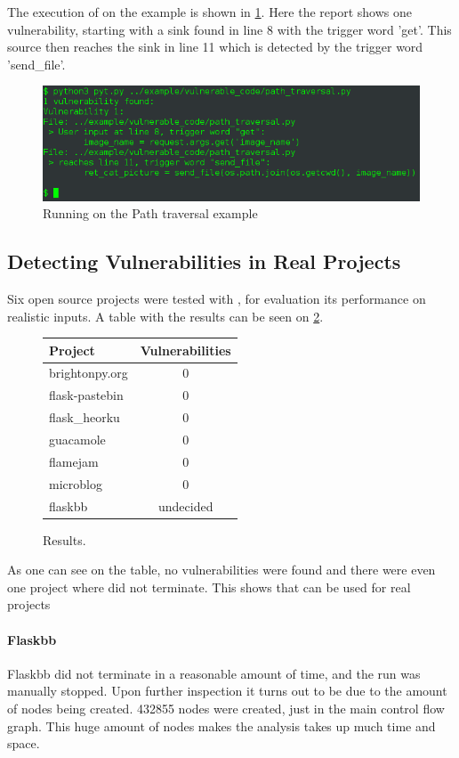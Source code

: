 The execution of \pyt{} on the example is shown in \cref{path_traversal:console}.
Here the report shows one vulnerability, starting with a sink found in line 8 with the trigger word 'get'.
This source then reaches the sink in line 11 which is detected by the trigger word 'send\_file'.

\begin{figure}
  \includegraphics[width=\textwidth]{./figures/path_traversal_console.png}
  \caption{Running \pyt{} on the Path traversal example}
  \label{path_traversal:console}
\end{figure}

\subsection{Detecting Vulnerabilities in Real Projects}\label{evaluation:real}
Six open source projects were tested with \pyt{}, for evaluation its performance on realistic inputs.
A table with the results can be seen on \cref{evaluation:real:table}.

\begin{figure}
  \centering
  \begin{tabular}{|l|c|}
    \hline
    \textbf{Project} & \textbf{Vulnerabilities} \\
    \hline
    \hline
    brightonpy.org\cite{brightonpy} & 0 \\
    flask-pastebin\cite{flask_pastebin} & 0 \\
    flask\_heorku\cite{flask_heroku} & 0 \\
    guacamole\cite{guacamole} & 0 \\
    flamejam\cite{flamejam} & 0 \\
    microblog\cite{microblog} & 0 \\
    flaskbb\cite{flaskbb} & undecided \\
    \hline
  \end{tabular}
  \caption{Results.}
  \label{evaluation:real:table}
\end{figure}

As one can see on the table, no vulnerabilities were found and there were even one project where \pyt{} did not terminate.
This shows that \pyt{} can be used for real projects

\paragraph{Flaskbb}
Flaskbb did not terminate in a reasonable amount of time, and the run was manually stopped.
Upon further inspection it turns out to be due to the amount of nodes being created.
432855 nodes were created, just in the main control flow graph.
This huge amount of nodes makes the analysis takes up much time and space.

